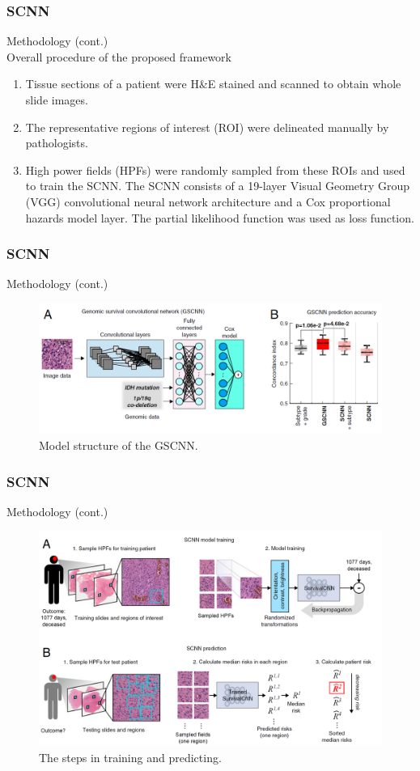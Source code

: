 \documentclass{beamer}
\begin{document}
	\begin{frame}
		\frametitle{SCNN}
		Methodology (cont.)\\
		\vspace{5mm}
		Overall procedure of the proposed framework
		\begin{enumerate}[A]
			\item Tissue sections of a patient were H\&E stained and scanned to obtain whole slide images.
			\item The representative regions of interest (ROI) were delineated manually by pathologists. 
			\item High power fields (HPFs) were randomly sampled from these ROIs and used to train the SCNN. The SCNN consists of a 19-layer Visual Geometry Group (VGG) convolutional neural network architecture and a Cox proportional hazards model layer. The partial likelihood function was used as loss function.
		\end{enumerate}
	\end{frame}
	
	\begin{frame}
		\frametitle{SCNN}
		Methodology (cont.)
		
		\begin{figure}[H]
			\centering
			\includegraphics[scale=0.27]{figures/GSCNN.png}
			\caption{Model structure of the GSCNN.}
			\label{fig:gscnn}
		\end{figure}
	\end{frame}

	\begin{frame}
		\frametitle{SCNN}
		Methodology (cont.)
		
		\begin{figure}[H]
			\centering
			\includegraphics[scale=0.12]{figures/scnn-train-pred.png}
			\caption{The steps in training and predicting.}
			\label{fig:scnn-overall}
		\end{figure}
	\end{frame}
	
\end{document}
